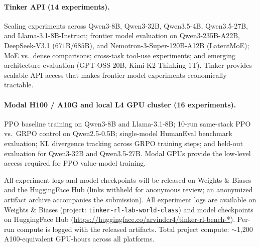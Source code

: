 \paragraph{Tinker API (14 experiments).}
Scaling experiments across Qwen3-8B, Qwen3-32B, Qwen3.5-4B, Qwen3.5-27B,
and Llama-3.1-8B-Instruct; frontier model evaluation on Qwen3-235B-A22B,
DeepSeek-V3.1 ($671$B/$685$B), and Nemotron-3-Super-120B-A12B (LatentMoE); MoE vs.~dense comparisons; cross-task
tool-use experiments; and emerging architecture evaluation (GPT-OSS-20B,
Kimi-K2-Thinking $1$T). Tinker provides scalable API access that makes frontier model
experiments economically tractable.

\paragraph{Modal H100 / A10G and local L4 GPU cluster (16 experiments).}
PPO baseline training on Qwen3-8B and Llama-3.1-8B; 10-run same-stack PPO vs.\ GRPO control on Qwen2.5-0.5B; single-model HumanEval
benchmark evaluation; KL divergence tracking across GRPO training steps;
and held-out evaluation for Qwen3-32B and Qwen3.5-27B. Modal GPUs
provide the low-level access required for PPO value-model training.

\ifdefined\ANONYMOUSBUILD
All experiment logs and model checkpoints will be released on Weights \&
Biases and the HuggingFace Hub (links withheld for anonymous review; an
anonymized artifact archive accompanies the submission).
\else
All experiment logs are available on Weights \& Biases (project:
\texttt{tinker-rl-lab-world-class}) and model checkpoints on HuggingFace
Hub (\url{https://huggingface.co/arvindcr4/tinker-rl-bench-*}).
\fi
Per-run compute is logged with the released artifacts. Total project compute:
$\sim$1,200 A100-equivalent GPU-hours across all platforms.

